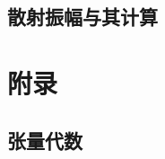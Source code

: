 \documentclass{article}
\begin{document}
\subsection{散射振幅与其计算}



































\section{附录}
\subsection{张量代数}
\end{document}
